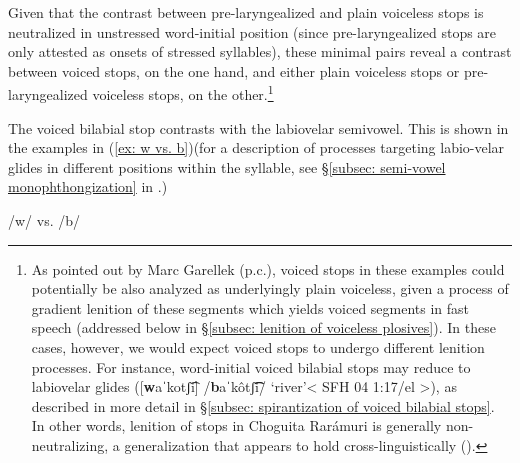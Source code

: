 Given that the contrast between pre-laryngealized and plain voiceless stops is neutralized in unstressed word-initial position (since pre-laryngealized stops are only attested as onsets of stressed syllables), these minimal pairs reveal a contrast between voiced stops, on the one hand, and either plain voiceless stops or pre-laryngealized voiceless stops, on the other.\footnote{As pointed out by Marc Garellek (p.c.), voiced stops in these examples could potentially be also analyzed as underlyingly plain voiceless, given a process of gradient lenition of these segments which yields voiced segments in fast speech (addressed below in §\ref{subsec: lenition of voiceless plosives}). In these cases, however, we would expect voiced stops to undergo different lenition processes. For instance, word-initial voiced bilabial stops may reduce to labiovelar glides ([\textbf{w}aˈkotʃ͡i] /\textbf{b}aˈkôtʃ͡͡i/ ‘river’< SFH 04 1:17/el >), as described in more detail in §\ref{subsec: spirantization of voiced bilabial stops}. In other words, lenition of stops in Choguita Rarámuri is generally non-neutralizing, a generalization that appears to hold cross-linguistically (\citealt{gurevich2013lenition}).}

The voiced bilabial stop contrasts with the labiovelar semivowel. This is shown in the examples in (\ref{ex: w vs. b})(for a description of processes targeting labio-velar glides in different positions within the syllable, see §\ref{subsec: semi-vowel monophthongization} in .)

\newpage
\ea\label{ex: w vs. b}
{/w/ vs. /b/}

    \z
\z

